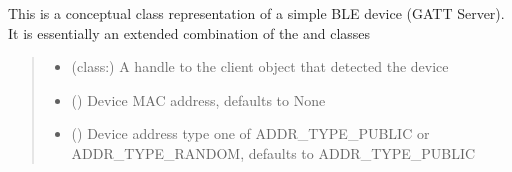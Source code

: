 \documentclass[letterpaper,10pt,english]{sphinxmanual}
\begin{document}
\begin{fulllineitems}
\label{\detokenize{filters:filters.string_filter.StringFilter}}
\pysigstartsignatures
{}
\pysigstopsignatures
\sphinxAtStartPar
This is a conceptual class representation of a simple BLE device
(GATT Server). It is essentially an extended combination of the
 and  classes
\begin{quote}\begin{description}
\begin{itemize}
\item {} 
\sphinxAtStartPar
{} (class:) \textendash{} A handle to the  client
object that detected the device

\item {} 
\sphinxAtStartPar
{} (\sphinxstyleliteralemphasis{\sphinxupquote{, }}) \textendash{} Device MAC address, defaults to None

\item {} 
\sphinxAtStartPar
{} (\sphinxstyleliteralemphasis{\sphinxupquote{, }}) \textendash{} Device address type \sphinxhyphen{} one of ADDR\_TYPE\_PUBLIC or
ADDR\_TYPE\_RANDOM, defaults to ADDR\_TYPE\_PUBLIC


\end{itemize}
\end{description}
\end{quote}
\end{fulllineitems}
\end{document}
